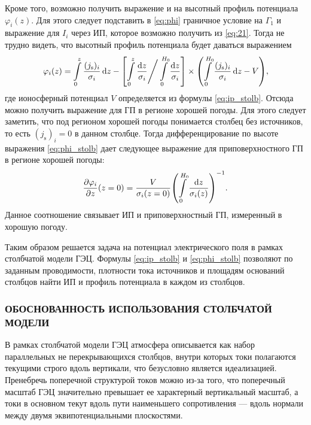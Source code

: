 Кроме того, возможно получить выражение и на высотный профиль потенциала $\varphi_i(z)$. Для этого следует подставить в \eqref{eq:phi} граничное условие на $\Gamma_1$ и выражение для $I_i$ через ИП, которое возможно получить из \eqref{eq:21}. Тогда не трудно видеть, что высотный профиль потенциала будет даваться выражением
\begin{equation}
    \varphi_i (z) = \int\limits_{0}^{z} \dfrac{(j_\mathrm{s})_i}{\sigma_i} \dd{z} - \qty[\int\limits_{0}^{z} \dfrac{\dd{z}}{\sigma_i} \Bigg/ \int\limits_{0}^{H_0} \dfrac{\dd{z}}{\sigma_i}]\times \qty(\int\limits_{0}^{H_0} \dfrac{(j_\mathrm{s})_i}{\sigma_i} \dd{z} - V),
    \label{eq:phi_stolb}
\end{equation}
где ионосферный потенциал $V$ определяется из формулы \eqref{eq:ip_stolb}. Отсюда можно получить выражение для ГП в регионе хорошей погоды. Для этого следует заметить, что под регионом хорошей погоды понимается столбец без источников, то есть $(j_\mathrm{s})_i=0$ в данном столбце. Тогда дифференцирование по высоте выражения \eqref{eq:phi_stolb} дает следующее выражение для приповерхностного ГП в регионе хорошей погоды:
\begin{equation}
\label{eq:pg_ip}
    \pdv{\varphi_i}{z} \qty(z=0) = \dfrac{V}{\sigma_i(z=0)} \qty(\int\limits_{0}^{H_0} \dfrac{\dd{z}}{\sigma_i(z)})^{-1}.
\end{equation}
Данное соотношение связывает ИП и приповерхностный ГП, измеренный в хорошую погоду.

Таким образом решается задача на потенциал электрического поля в рамках столбчатой модели ГЭЦ. Формулы \eqref{eq:ip_stolb} и \eqref{eq:phi_stolb} позволяют по заданным проводимости, плотности тока источников и площадям оснований столбцов найти ИП и профиль потенциала в каждом из столбцов.

\subsubsection{ОБОСНОВАННОСТЬ ИСПОЛЬЗОВАНИЯ СТОЛБЧАТОЙ МОДЕЛИ}
\label{sec:obosn}


В рамках столбчатой модели ГЭЦ атмосфера описывается как набор параллельных не перекрывающихся столбцов, внутри которых токи полагаются текущими строго вдоль вертикали, что безусловно является идеализацией. Пренебречь поперечной структурой токов можно из-за того, что поперечный масштаб ГЭЦ значительно превышает ее характерный вертикальный масштаб, а токи в основном текут вдоль пути наименьшего сопротивления --- вдоль нормали между двумя эквипотенциальными плоскостями.

